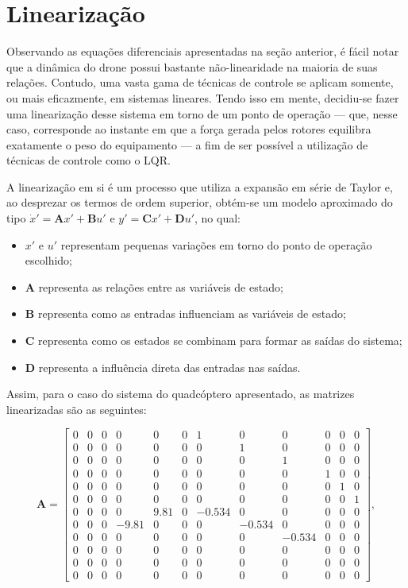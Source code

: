 \section{Linearização}
Observando as equações diferenciais apresentadas na seção anterior, é fácil notar que a dinâmica do drone possui 
bastante não-linearidade na maioria de suas relações. Contudo, uma vasta gama de técnicas de controle se aplicam 
somente, ou mais eficazmente, em sistemas lineares. Tendo isso em mente, decidiu-se fazer uma linearização desse 
sistema em torno de um ponto de operação — que, nesse caso, corresponde ao instante em que a força gerada pelos 
rotores equilibra exatamente o peso do equipamento — a fim de ser possível a utilização de técnicas de controle 
como o LQR.

A linearização em si é um processo que utiliza a expansão em série de Taylor e, ao desprezar os termos de ordem 
superior, obtém-se um modelo aproximado do tipo $\dot{x}' = \mathbf{A} x' + \mathbf{B} u'$ e $y' = \mathbf{C} x' 
+ \mathbf{D} u'$, no qual:

\begin{itemize}
    \item $x'$ e $u'$ representam pequenas variações em torno do ponto de operação escolhido;
    \item $\mathbf{A}$ representa as relações entre as variáveis de estado;
    \item $\mathbf{B}$ representa como as entradas influenciam as variáveis de estado;
    \item $\mathbf{C}$ representa como os estados se combinam para formar as saídas do sistema;
    \item $\mathbf{D}$ representa a influência direta das entradas nas saídas.
\end{itemize}

Assim, para o caso do sistema do quadcóptero apresentado, 
as matrizes linearizadas são as seguintes:

\[
\mathbf{A} =
\left[\begin{array}{cccccccccccc}
0 & 0 & 0 & 0 & 0 & 0 & 1 & 0 & 0 & 0 & 0 & 0 \\
0 & 0 & 0 & 0 & 0 & 0 & 0 & 1 & 0 & 0 & 0 & 0 \\
0 & 0 & 0 & 0 & 0 & 0 & 0 & 0 & 1 & 0 & 0 & 0 \\
0 & 0 & 0 & 0 & 0 & 0 & 0 & 0 & 0 & 1 & 0 & 0 \\
0 & 0 & 0 & 0 & 0 & 0 & 0 & 0 & 0 & 0 & 1 & 0 \\
0 & 0 & 0 & 0 & 0 & 0 & 0 & 0 & 0 & 0 & 0 & 1 \\
0 & 0 & 0 & 0 & 9.81 & 0 & -0.534 & 0 & 0 & 0 & 0 & 0 \\
0 & 0 & 0 & -9.81 & 0 & 0 & 0 & -0.534 & 0 & 0 & 0 & 0 \\
0 & 0 & 0 & 0 & 0 & 0 & 0 & 0 & -0.534 & 0 & 0 & 0 \\
0 & 0 & 0 & 0 & 0 & 0 & 0 & 0 & 0 & 0 & 0 & 0 \\
0 & 0 & 0 & 0 & 0 & 0 & 0 & 0 & 0 & 0 & 0 & 0 \\
0 & 0 & 0 & 0 & 0 & 0 & 0 & 0 & 0 & 0 & 0 & 0
\end{array}\right],
\]

